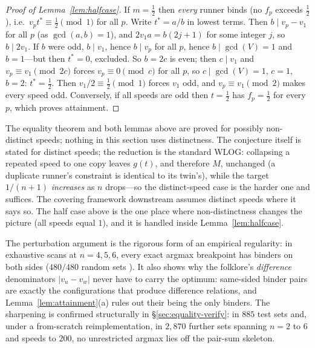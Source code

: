 \begin{proof}[Proof of Lemma~\ref{lem:halfcase}]
If $m=\tfrac12$ then \emph{every} runner binds (no $f_p$ exceeds
$\tfrac12$), i.e.\ $v_p t^\ast\equiv \tfrac12 \pmod 1$ for all $p$. Write
$t^\ast=a/b$ in lowest terms. Then $b\mid v_p-v_1$ for all $p$ (as
$\gcd(a,b)=1$), and $2v_1 a=b(2j+1)$ for some integer $j$, so $b\mid
2v_1$. If $b$ were odd, $b\mid v_1$, hence $b\mid v_p$ for all $p$, hence
$b\mid\gcd(V)=1$ and $b=1$---but then $t^\ast=0$, excluded. So $b=2c$ is
even; then $c\mid v_1$ and $v_p\equiv v_1\pmod{2c}$ forces
$v_p\equiv 0\pmod c$ for all $p$, so $c\mid\gcd(V)=1$, $c=1$, $b=2$:
$t^\ast=\tfrac12$. Then $v_1/2\equiv\tfrac12\pmod 1$ forces $v_1$ odd,
and $v_p\equiv v_1\pmod 2$ makes every speed odd. Conversely, if all
speeds are odd then $t=\tfrac12$ has $f_p=\tfrac12$ for every $p$,
which proves attainment.
\end{proof}

\begin{remark}
The equality theorem and both lemmas above are proved for possibly
non-distinct speeds; nothing in this section uses distinctness. The
conjecture itself is stated for distinct speeds; the reduction is the
standard WLOG: collapsing a repeated speed to one copy leaves $g(t)$,
and therefore $M$, unchanged (a duplicate runner's constraint is
identical to its twin's), while the target $1/(n{+}1)$ \emph{increases}
as $n$ drops---so the distinct-speed case is the harder one and suffices.
The covering framework downstream assumes distinct speeds where it says
so. The half case above is the one place where non-distinctness changes
the picture (all speeds equal $1$), and it is handled inside
Lemma~\ref{lem:halfcase}.
\end{remark}

\begin{remark}\label{rem:twosided}
The perturbation argument is the rigorous form of an empirical
regularity: in exhaustive scans at $n=4,5,6$, every exact argmax
breakpoint has binders on both sides ($480/480$ random sets
\cite{prog-artifacts}). It also shows why the folklore's
\emph{difference} denominators $|v_u-v_w|$ never have to carry the
optimum: same-sided binder pairs are exactly the configurations that
produce difference relations, and Lemma~\ref{lem:attainment}(a) rules out
their being the only binders. The sharpening is confirmed structurally in
\S\ref{sec:equality-verify}: in $885$ test sets and, under a from-scratch
reimplementation, in $2{,}870$ further sets spanning $n=2$ to $6$ and
speeds to $200$, no unrestricted argmax lies off the pair-sum skeleton.
\end{remark}

